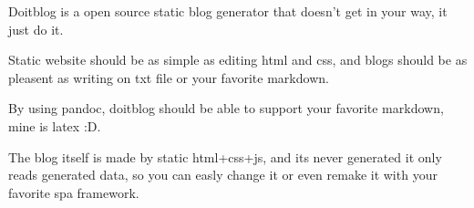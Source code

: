 \documentclass{article}
\begin{document}
Doitblog is a open source static blog generator that doesn't get in your way, it just do it.

Static website should be as simple as editing html and css, and blogs should be 
as pleasent as writing on txt file or your favorite markdown.

By using pandoc, doitblog should be able to support your favorite markdown, mine is latex :D.

The blog itself is made by static html+css+js, and its never generated it only reads generated data, 
so you can easly change it or even remake it with your favorite spa framework.
\end{document}
